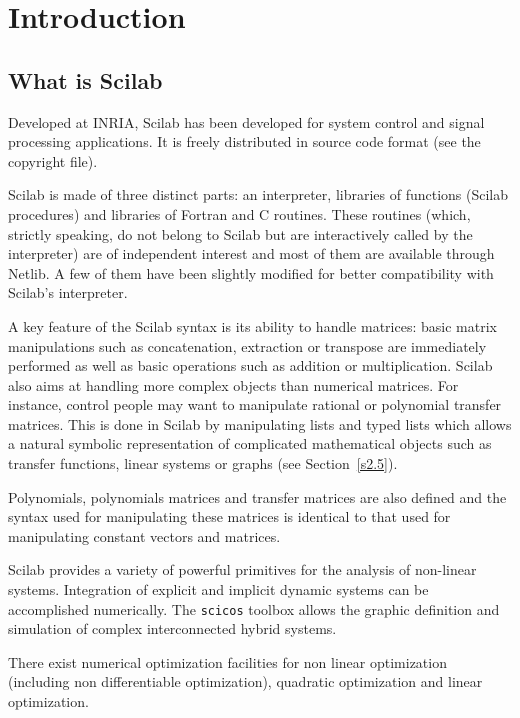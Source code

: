 
\chapter{Introduction}

\section{What is Scilab}

Developed at INRIA, Scilab has been developed for system control and
signal processing applications. It 
is freely distributed in source code format (see the copyright file). 

Scilab is made of three distinct parts: an interpreter, 
libraries of functions (Scilab procedures) and libraries of Fortran 
and C routines. 
These routines (which, strictly speaking, do not belong to Scilab but
are interactively called by the interpreter) are of 
independent interest and most of them are available through Netlib. 
A few of them have been slightly modified for better compatibility
with Scilab's interpreter.
 
A key feature of the Scilab syntax is its ability to handle matrices: 
basic matrix manipulations such as concatenation, 
extraction or transpose are immediately performed as well as basic operations
such as addition or multiplication. Scilab also aims at handling more complex
objects than numerical matrices. For instance, control people may want
to manipulate rational or polynomial transfer matrices. This is
done in Scilab by manipulating lists and typed lists which allows a 
natural symbolic representation of complicated
mathematical objects such as transfer functions, linear systems or graphs
(see Section~\ref{s2.5}).

        Polynomials, polynomials matrices and transfer matrices 
are also defined and the syntax used for manipulating these matrices
is identical to that used for manipulating constant vectors and matrices.

        Scilab provides a variety of powerful primitives for
the analysis of non-linear systems.  
Integration of explicit and implicit dynamic systems can be accomplished 
numerically.  The {\tt scicos} toolbox allows the graphic definition
and simulation of complex interconnected hybrid systems.

 There exist numerical optimization 
facilities for non linear optimization (including
non differentiable optimization), quadratic optimization and 
linear optimization.

